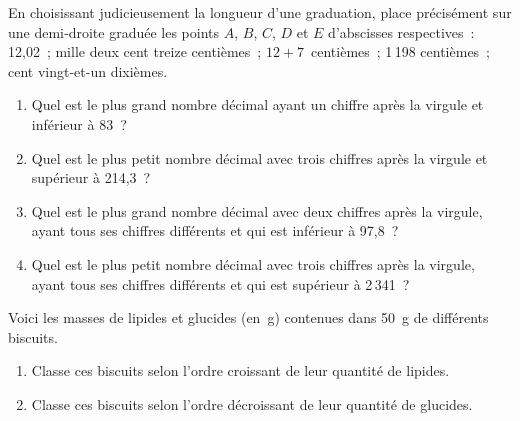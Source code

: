 \begin{exercice}[À placer]
En choisissant judicieusement la longueur d'une graduation, place précisément sur une demi‑droite graduée les points $A$, $B$, $C$, $D$ et $E$ d'abscisses respectives : \\[0.75em]
12,02 ; mille deux cent treize centièmes ; $12 + 7$ centièmes ; 1\,198 centièmes ; cent vingt-et-un dixièmes.
\end{exercice}


\begin{exercice}[Comparaison]
\begin{enumerate}
 \item Quel est le plus grand nombre décimal ayant un chiffre après la virgule et inférieur à 83 ?
 \item Quel est le plus petit nombre décimal avec trois chiffres après la virgule et supérieur à 214,3 ?
 \item Quel est le plus grand nombre décimal avec deux chiffres après la virgule, ayant tous ses chiffres différents et qui est inférieur à 97,8 ?
 \item Quel est le plus petit nombre décimal avec trois chiffres après la virgule, ayant tous ses chiffres différents et qui est supérieur à 2\,341 ?
 \end{enumerate}
\end{exercice}


\begin{exercice} 
Voici les masses de lipides et glucides (en g) contenues dans 50 g de différents biscuits.
\begin{enumerate}
 \item Classe ces biscuits selon l'ordre croissant de leur quantité de lipides.
 \item Classe ces biscuits selon l'ordre décroissant de leur quantité de glucides.
 \end{enumerate}
\end{exercice}


